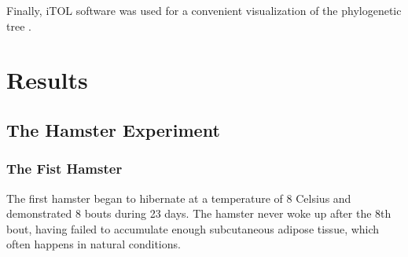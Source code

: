 \documentclass[14pt,a4paper]{scrartcl}
\begin{document}
Finally, iTOL software was used for a convenient visualization of the phylogenetic tree \citep{Letunic2007}.











\newpage
\section{Results}
\label{sec:Results} 

\subsection{The Hamster Experiment}
\label{sec:Results:THe Hamster Experiment} 


\subsubsection{The Fist Hamster}
\label{sec:Results:The Hamster Experiment:The Fist Hamster} 

The first hamster began to hibernate at a temperature of 8 Celsius and demonstrated 8 bouts during 23 days. The hamster never woke up after the 8th bout, having failed to accumulate enough subcutaneous adipose tissue, which often happens in natural conditions.
\end{document}
